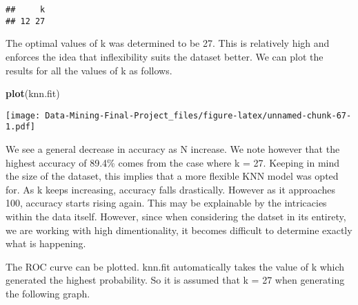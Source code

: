\documentclass[
]{article}
\newenvironment{Shaded}{\begin{snugshade}}{\end{snugshade}}
\newcommand{\AttributeTok}[1]{\textcolor[rgb]{0.13,0.29,0.53}{#1}}
\newcommand{\CommentTok}[1]{\textcolor[rgb]{0.56,0.35,0.01}{\textit{#1}}}
\newcommand{\ConstantTok}[1]{\textcolor[rgb]{0.56,0.35,0.01}{#1}}
\newcommand{\DecValTok}[1]{\textcolor[rgb]{0.00,0.00,0.81}{#1}}
\newcommand{\FunctionTok}[1]{\textcolor[rgb]{0.13,0.29,0.53}{\textbf{#1}}}
\newcommand{\NormalTok}[1]{#1}
\newcommand{\OtherTok}[1]{\textcolor[rgb]{0.56,0.35,0.01}{#1}}
\newcommand{\SpecialCharTok}[1]{\textcolor[rgb]{0.81,0.36,0.00}{\textbf{#1}}}
\newcommand{\StringTok}[1]{\textcolor[rgb]{0.31,0.60,0.02}{#1}}
\begin{document}
\begin{verbatim}
##     k
## 12 27
\end{verbatim}

The optimal values of k was determined to be 27. This is relatively high
and enforces the idea that inflexibility suits the dataset better. We
can plot the results for all the values of k as follows.

\begin{Shaded}
\begin{Highlighting}[]
\FunctionTok{plot}\NormalTok{(knn.fit)}
\end{Highlighting}
\end{Shaded}

\texttt{[image: Data-Mining-Final-Project\_files/figure-latex/unnamed-chunk-67-1.pdf]}

We see a general decrease in accuracy as N increase. We note however
that the highest accuracy of 89.4\% comes from the case where k = 27.
Keeping in mind the size of the dataset, this implies that a more
flexible KNN model was opted for. As k keeps increasing, accuracy falls
drastically. However as it approaches 100, accuracy starts rising again.
This may be explainable by the intricacies within the data itself.
However, since when considering the datset in its entirety, we are
working with high dimentionality, it becomes difficult to determine
exactly what is happening.

The ROC curve can be plotted. knn.fit automatically takes the value of k
which generated the highest probability. So it is assumed that k = 27
when generating the following graph.

\begin{Shaded}
\end{Shaded}
\end{document}
